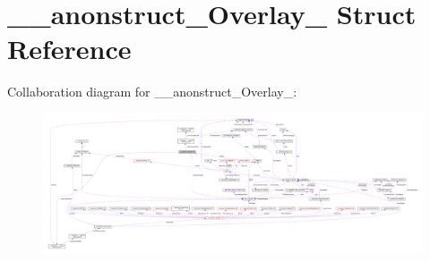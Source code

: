\hypertarget{struct____anonstruct__Overlay__48}{}\section{\+\_\+\+\_\+anonstruct\+\_\+\+Overlay\+\_ Struct Reference}
\label{struct____anonstruct__Overlay__48}


Collaboration diagram for \+\_\+\+\_\+anonstruct\+\_\+\+Overlay\+\_\+:
\nopagebreak
\begin{figure}[H]
\begin{center}
\leavevmode
\includegraphics[width=350pt]{struct____anonstruct__Overlay__48__coll__graph}
\end{center}
\end{figure}
